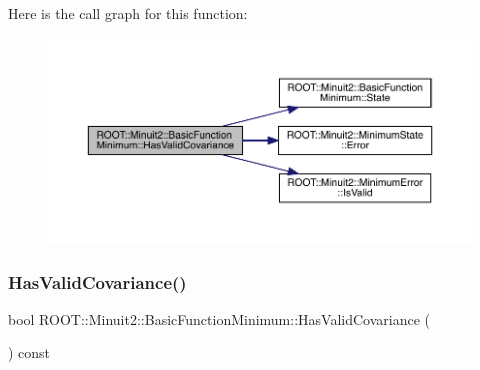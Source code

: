 Here is the call graph for this function\+:
\nopagebreak
\begin{figure}[H]
\begin{center}
\leavevmode
\includegraphics[width=350pt]{de/d25/classROOT_1_1Minuit2_1_1BasicFunctionMinimum_a2bf14deac281ae646e88a2fa6d0b5012_cgraph}
\end{center}
\end{figure}
\mbox{\label{classROOT_1_1Minuit2_1_1BasicFunctionMinimum_a2bf14deac281ae646e88a2fa6d0b5012}} 
\subsubsection{\texorpdfstring{HasValidCovariance()}{HasValidCovariance()}\hspace{0.1cm}{\footnotesize\ttfamily [3/3]}}
{\footnotesize\ttfamily bool R\+O\+O\+T\+::\+Minuit2\+::\+Basic\+Function\+Minimum\+::\+Has\+Valid\+Covariance (\begin{DoxyParamCaption}{ }\end{DoxyParamCaption}) const\hspace{0.3cm}{\ttfamily [inline]}}

